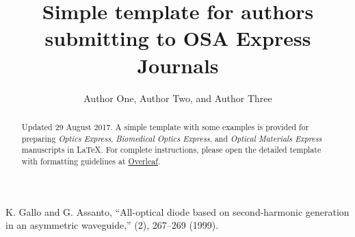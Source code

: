 \documentclass[10pt]{article}
\begin{document}
\title{Simple template for authors submitting to OSA Express Journals}

\author{Author One, Author Two, and Author Three}

\address{Peer Review, Publications Department, The Optical Society, 2010 Massachusetts Avenue NW, Washington, DC 20036, USA\\
Publications Department, The Optical Society, 2010 Massachusetts Avenue NW, Washington, DC 20036, USA\\
Currently with the Department of Electronic Journals, The Optical Society, 2010 Massachusetts Avenue NW, Washington, DC 20036, USA}




\begin{abstract}
Updated 29 August 2017. A simple template with some examples is provided for preparing \textit{Optics Express}, \textit{Biomedical Optics Express}, and \textit{Optical Materials Express} manuscripts in \LaTeX. For complete instructions, please open the detailed template with formatting guidelines at \href{http://www.overleaf.com/docs?template=osa-opex-guide}{Overleaf}.
\end{abstract}


\begin{thebibliography}{99}

 K. Gallo and G. Assanto, ``All-optical diode based on second-harmonic generation in an asymmetric waveguide,'' (2), 267--269 (1999).

\end{thebibliography}

\end{document}

